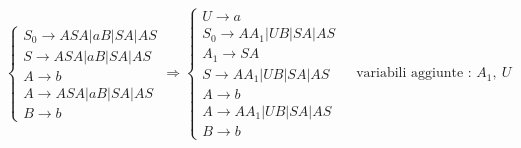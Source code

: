 \documentclass[10pt, letterpaper]{report}
\begin{document}
\begin{itemize}
$$\begin{cases}
    S_0 \longrightarrow ASA |  aB | SA |AS \\
    S\longrightarrow ASA |  aB | SA |AS   \\ 
    A \longrightarrow b \\
    A\longrightarrow ASA |  aB | SA |AS \\ 
    B \longrightarrow b
\end{cases}\Longrightarrow 
\begin{cases}
    U\longrightarrow a\\
    S_0 \longrightarrow AA_1 |  UB | SA |AS \\
    A_1 \longrightarrow SA \\
    S\longrightarrow AA_1 |  UB | SA |AS   \\ 
    A \longrightarrow b \\
    A\longrightarrow AA_1 |  UB | SA |AS \\ 
    B \longrightarrow b
\end{cases} \ \ \ \ \ \text{variabili aggiunte : }A_1,\ U
$$
\end{itemize}
\flowerLine 
\end{document}
